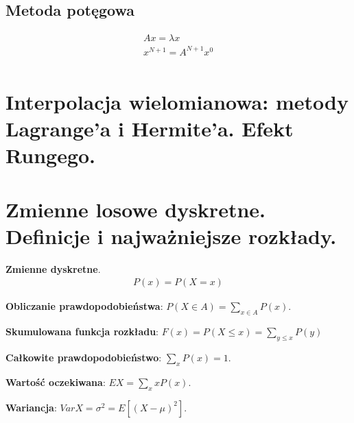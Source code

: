 \documentclass[12pt]{article}
\begin{document}
    \subsection{Metoda potęgowa}
    \begin{align*}
        Ax = \lambda x\\
        x^{N+1} = A^{N+1} x^0\\
    \end{align*}

    \newpage

    \section{Interpolacja wielomianowa: metody Lagrange'a i Hermite'a. Efekt Rungego.}

    \newpage

    \section{Zmienne losowe dyskretne. Definicje i najważniejsze rozkłady.}

    \begin{definition}
        \textbf{Zmienne dyskretne}.
        \begin{align*}
            P(x) = P(X=x)
        \end{align*}

        \textbf{Obliczanie prawdopodobieństwa}: $P(X \in A) = \sum_{x \in A} P(x)$.


        \textbf{Skumulowana funkcja rozkładu}: $F(x) = P(X \leq x) = \sum_{y \leq x}P(y)$

        \textbf{Całkowite prawdopodobieństwo}: $\sum_{x}P(x) = 1$.

        \textbf{Wartość oczekiwana}: $EX = \sum_{x} x P(x)$.

        \textbf{Wariancja}: $VarX = \sigma^2 = E[ (X - \mu)^2 ]$.
    \end{definition}

\end{document}
